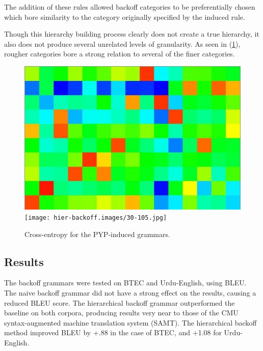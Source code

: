 The addition of these rules allowed backoff categories to be preferentially chosen which bore similarity to the category originally specified by the induced rule.

Though this hierarchy building process clearly does not create a true hierarchy, it also does not produce several unrelated levels of granularity.  As seen in (\ref{fig:entropy}), rougher categories bore a strong relation to several of the finer categories.

\begin{figure}
\label{fig:entropy}
\caption{Cross-entropy for the PYP-induced grammars.}
\includegraphics{hier-backoff.images/15-10.jpg}
\texttt{[image: hier-backoff.images/30-105.jpg]}
\end{figure}

\subsection{Results}

The backoff grammars were tested on BTEC and Urdu-English, using BLEU.  The naive backoff grammar did not have a strong effect on the results, causing a reduced BLEU score.  The hierarchical backoff grammar outperformed the baseline on both corpora, producing results very near to those of the CMU syntax-augmented machine translation system (SAMT).  The hierarchical backoff method improved BLEU by +.88 in the case of BTEC, and +1.08 for Urdu-English.

